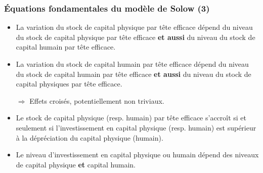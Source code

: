 \documentclass[10pt,notheorems]{beamer}
\theoremstyle{plain}
\theoremstyle{definition} %
\begin{document}
\begin{frame}
  \frametitle{Équations fondamentales du modèle de Solow (3)}

  \begin{itemize}

  \item La variation du stock de capital physique par tête efficace dépend du niveau du stock de capital physique par tête efficace \textbf{et aussi} du niveau du stock de capital humain par tête efficace.\newline

  \item La variation du stock de capital humain par tête efficace dépend du niveau du stock de capital humain par tête efficace \textbf{et aussi} du niveau du stock de capital physiques par tête efficace.\newline

  \item[$\Rightarrow$] Effets croisés, potentiellement non triviaux.\newline

  \item Le stock de capital physique (resp. humain) par tête efficace s'accroît si et seulement si l'investissement en capital physique (resp. humain) est supérieur à la dépréciation du capital physique (humain).\newline

    \item Le niveau d'investissement en capital physique ou humain dépend des niveaux de capital physique \textbf{et} capital humain.

  \end{itemize}

\end{frame}
\end{document}
